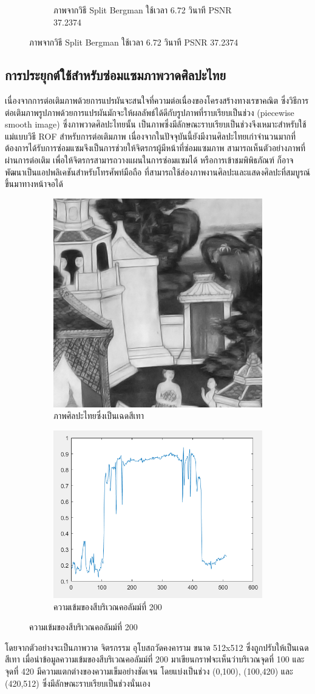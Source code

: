 \documentclass[hidelinks,a4paper,14pt]{article}
\numberwithin{equation}{section}							%
\begin{document}
{\begin{figure}[H]
\begin{subfigure}{0.4\linewidth}
					\caption{ภาพจากวิธี Split Bergman ใช้เวลา 6.72 วินาที PSNR 37.2374}
				\end{subfigure}
			\end{figure}
			
			\subsection{การประยุกต์ใช้สำหรับซ่อมแซมภาพวาดศิลปะไทย}
			
			\hspace{0.85cm}เนื่องจากการต่อเติมภาพด้วยการแปรผันจะสนใจที่ความต่อเนื่องของโครงสร้างทางเรขาคณิต ซึ่งวิธีการต่อเติมภาพรูปภาพด้วยการแปรผันมักจะให้ผลลัพธ์ได้ดีกับรูปภาพที่ราบเรียบเป็นช่วง (piecewise smooth image) \cite{ref:defination-of-variation-inpaint}  ซึ่งภาพวาดศิลปะไทยนั้น เป็นภาพซึ่งมีลักษณะราบเรียบเป็นช่วงจึงเหมาะสำหรับใช้แม่แบบวิธี ROF สำหรับการต่อเติมภาพ เนื่องจากในปัจจุบันนี้ยังมีงานศิลปะไทยเก่าจำนวนมากที่ต้องการได้รับการซ่อมแซมจึงเป็นการช่วยให้จิตรกรผู้มีหน้าที่ซ่อมแซมภาพ สามารถเห็นตัวอย่างภาพที่ผ่านการต่อเติม เพื่อให้จิตรกรสามารถวางแผนในการซ่อมแซมได้ หรือการเข้าชมพิพิธภัณฑ์ ก็อาจพัฒนาเป็นแอปพลิเคชันสำหรับโทรศัพท์มือถือ ที่สามารถใช้ส่องภาพงานศิลปะและแสดงศิลปะที่สมบูรณ์ขึ้นมาทางหน้าจอได้
			\begin{figure}[H]
				\centering
				\begin{subfigure}{0.4\linewidth}
					\centering
					\includegraphics[width=0.4\linewidth]{images/show_peicewise/thaiart_gray.png}
					\caption{ภาพศิลปะไทยซึ่งเป็นเฉดสีเทา}
				\end{subfigure}
				\begin{subfigure}{0.4\linewidth}
					\centering
					\includegraphics[width=0.4\linewidth]{images/show_peicewise/thaiart_is_piecewise.png}
					\caption{ความเข้มของสีบริเวณคอลัมม์ที่ 200}
				\end{subfigure}				
			\end{figure}
			โดยจากตัวอย่างจะเป็นภาพวาด จิตรกรรม อุโบสถวัดคงคาราม ขนาด 512x512 ซึ่งถูกปรับให้เป็นเฉดสีเทา เมื่อนำข้อมูลความเข้มของสีบริเวณคอลัมม์ที่ 200 มาเขียนกราฟจะเห็นว่าบริเวณจุดที่ 100 และจุดที่ 420 มีความแตกต่างของความเข็มอย่างชัดเจน โดยแบ่งเป็นช่วง (0,100), (100,420) และ (420,512) ซึ่งมีลักษณะราบเรียบเป็นช่วงนั่นเอง
				
}
\end{document}
